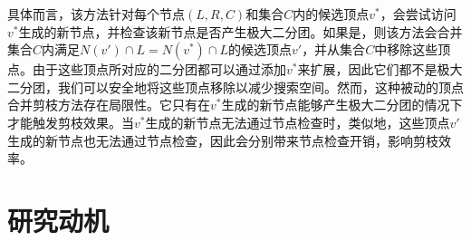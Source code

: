 具体而言，该方法针对每个节点$(L,R,C)$和集合$C$内的候选顶点$v^*$，会尝试访问$v^*$生成的新节点，并检查该新节点是否产生极大二分团。如果是，则该方法会合并集合$C$内满足$N(v') \cap L = N(v^*) \cap L$的候选顶点$v'$，并从集合$C$中移除这些顶点。由于这些顶点所对应的二分团都可以通过添加$v^*$来扩展，因此它们都不是极大二分团，我们可以安全地将这些顶点移除以减少搜索空间。然而，这种被动的顶点合并剪枝方法存在局限性。它只有在$v^*$生成的新节点能够产生极大二分团的情况下才能触发剪枝效果。当$v^*$生成的新节点无法通过节点检查时，类似地，这些顶点$v'$生成的新节点也无法通过节点检查，因此会分别带来节点检查开销，影响剪枝效率。



  

    


\section{研究动机}
\label{sec:ambea_motivation}

